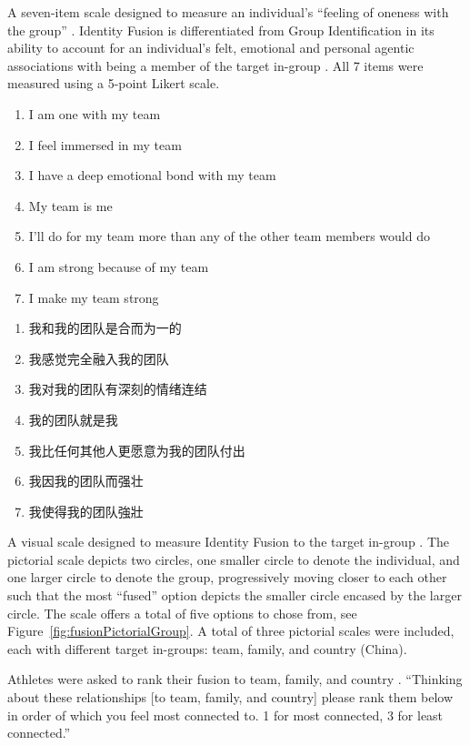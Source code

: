 \begin{CJK}{UTF8}{gbsn}
\begin{description}[labelindent=1cm]
  \item [Identity Fusion Verbal] A seven-item scale designed to measure an individual's ``feeling of oneness with the group'' \citep{Swann2009}.  Identity Fusion is differentiated from Group Identification in its ability to account for an individual's felt, emotional and personal agentic associations with being a member of the target in-group \citep{Swann2012a}.  All 7 items were measured using a 5-point Likert scale.
    \begin{enumerate}
      \item I am one with my team
      \item I feel immersed in my team
      \item I have a deep emotional bond with my team
      \item My team is me
      \item I’ll do for my team more than any of the other team members would do
      \item I am strong because of my team
      \item I make my team strong
    \end{enumerate}

    \begin{mccorrection}
          \begin{enumerate}
            \item 我和我的团队是合而为一的
            \item 我感觉完全融入我的团队
            \item 我对我的团队有深刻的情绪连结
            \item 我的团队就是我
            \item 我比任何其他人更愿意为我的团队付出
            \item 我因我的团队而强壮
            \item 我使得我的团队強壯
          \end{enumerate}
    \end{mccorrection}
  \item [Identity Fusion Pictorial] A visual scale designed to measure Identity Fusion to the target in-group \citep{Swann2009}. The pictorial scale depicts two circles, one smaller circle to denote the individual, and one larger circle to denote the group, progressively moving closer to each other such that the most ``fused'' option depicts the smaller circle encased by the larger circle. The scale offers a total of five options to chose from, see Figure~\ref{fig:fusionPictorialGroup}.  A total of three pictorial scales were included, each with different target in-groups: team, family, and country (China).
  \item [Fusion Pictorial Rank] Athletes were asked to rank their fusion to team, family, and country \citep{Whitehouse2014}.  ``Thinking about these relationships [to team, family, and country] please rank them below in order of which you feel most connected to. 1 for most connected, 3 for least connected.''
  \end{description}



\end{CJK}
